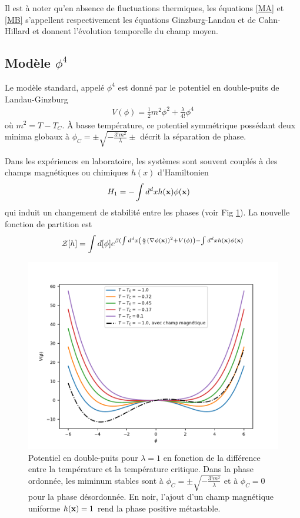Il est à noter qu'en absence de fluctuations thermiques, les équations \ref{MA} et \ref{MB} s'appellent respectivement les équations Ginzburg-Landau et de Cahn-Hillard \cite{cahn_free_nodate,langer_new_1975,kawasaki_growth_1978} et donnent l'évolution temporelle du champ moyen. 

    \subsection{Modèle $\phi^4$}
    

    Le modèle standard, appelé $\phi^4$ est donné par le potentiel en double-puits de Landau-Ginzburg \cite[§ 45]{l_landau_physique_1990} 
\begin{align}
    V(\phi) = \frac{1}{2} m^2 \phi^2 + \frac{\lambda}{4!} \phi^4
    \label{phi4}
\end{align} 
où $m^2 = T-T_C$. À basse température, ce potentiel symmétrique possédant deux minima globaux à $\phi_C = \pm \sqrt{- \frac{3! m^2}{\lambda} } \pm$ décrit la séparation de phase.


Dans les expériences en laboratoire, les systèmes sont souvent couplés à des champs magnétiques ou chimiques $h(x)$ d'Hamiltonien
\begin{align}
    H_1 &= - \int d^dx h({\bf x})\phi({\bf x})
    \label{champ-externe}
\end{align}
qui induit un changement de stabilité entre les phases (voir Fig \ref{double-puits-temperature}). La nouvelle fonction de partition est
\begin{align}
    \mathcal{Z}[h] = \int d [\phi] e^{ \beta (\int d^d x \left( \frac{\kappa}{2} (\nabla \phi({\bf x}))^2 + V(\phi) \right) - \int d^d x h({\bf x}) \phi({\bf x})}
\end{align}

\begin{figure}
    \centering
    \includegraphics[width=0.6\linewidth]{intro/double-puit-en-fonction-temp.pdf}
    \caption{Potentiel en double-puits pour $\lambda=1$ en fonction de la différence entre la température et la température critique. Dans la phase ordonnée, les miminum stables sont à $\phi_C =\pm \sqrt{- \frac{3! m^2}{\lambda} } $ et à $\phi_C = 0$ pour la phase désordonnée. En noir, l'ajout d'un champ magnétique uniforme $h({\bf x}) = 1$ rend la phase positive métastable.}
    \label{double-puits-temperature}
\end{figure}


